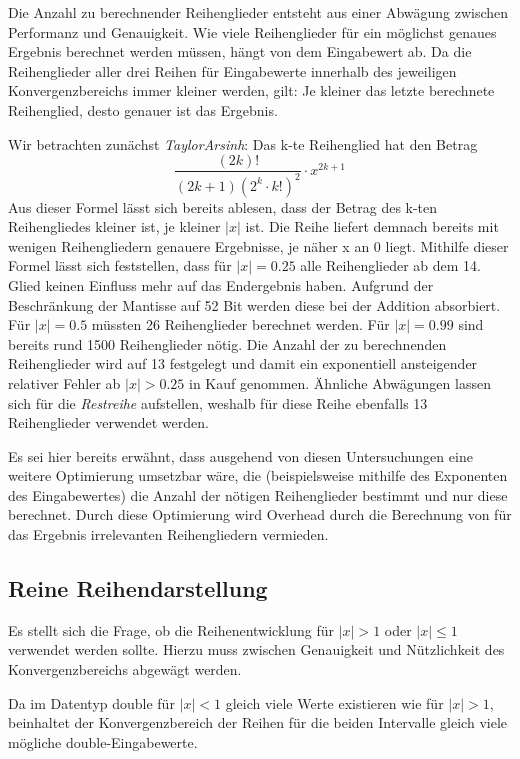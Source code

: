\documentclass[course=erap] {aspdoc}
\begin{document}
    Die Anzahl zu berechnender Reihenglieder entsteht aus einer Abwägung zwischen Performanz und Genauigkeit.
    Wie viele Reihenglieder für ein möglichst genaues Ergebnis berechnet werden müssen, hängt von dem Eingabewert ab.
    Da die Reihenglieder aller drei Reihen für Eingabewerte innerhalb des jeweiligen Konvergenzbereichs immer kleiner werden, gilt:
    Je kleiner das letzte berechnete Reihenglied, desto genauer ist das Ergebnis.

    Wir betrachten zunächst \textit{TaylorArsinh}:
    Das k-te Reihenglied hat den Betrag
    \[
        \frac{(2k)!}{(2k + 1)(2^k \cdot k!)^2}\cdot x^{2k+1}
    \]
    Aus dieser Formel lässt sich bereits ablesen, dass der Betrag des k-ten Reihengliedes kleiner ist, je kleiner $|x|$ ist.
    Die Reihe liefert demnach bereits mit wenigen Reihengliedern genauere Ergebnisse, je näher x an 0 liegt.
    Mithilfe dieser Formel lässt sich feststellen, dass für $|x| = 0.25$ alle Reihenglieder ab dem 14. Glied keinen Einfluss mehr auf das Endergebnis haben.
    Aufgrund der Beschränkung der Mantisse auf 52 Bit werden diese bei der Addition absorbiert.
    Für $|x| = 0.5$ müssten 26 Reihenglieder berechnet werden.
    Für $|x| = 0.99$ sind bereits rund 1500 Reihenglieder nötig.
    Die Anzahl der zu berechnenden Reihenglieder wird auf 13 festgelegt und damit ein exponentiell ansteigender relativer Fehler ab $|x| > 0.25$ in Kauf genommen.
    Ähnliche Abwägungen lassen sich für die \textit{Restreihe} aufstellen, weshalb für diese Reihe ebenfalls 13 Reihenglieder verwendet werden.

    Es sei hier bereits erwähnt, dass ausgehend von diesen Untersuchungen eine weitere Optimierung umsetzbar wäre, die (beispielsweise mithilfe des Exponenten des Eingabewertes) die Anzahl der nötigen Reihenglieder bestimmt und nur diese berechnet.
    Durch diese Optimierung wird Overhead durch die Berechnung von für das Ergebnis irrelevanten Reihengliedern vermieden.

    \subsection{Reine Reihendarstellung}\label{subsec:reine-reihendarstellung}

    Es stellt sich die Frage, ob die Reihenentwicklung für $|x| > 1$ oder $|x|\leq1$ verwendet werden sollte. Hierzu muss zwischen Genauigkeit und Nützlichkeit des Konvergenzbereichs abgewägt werden.

    Da im Datentyp double für $|x|<1$ gleich viele Werte existieren wie für $|x|>1$, beinhaltet der Konvergenzbereich der Reihen für die beiden Intervalle gleich viele mögliche double-Eingabewerte.
\end{document}
